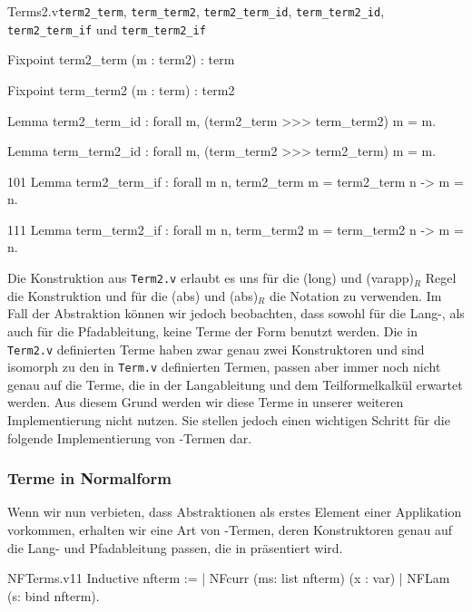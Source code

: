 \begin{multicode}{Terms2.v}{}{\texttt{term2\_term}, \texttt{term\_term2}, \texttt{term2\_term\_id}, \texttt{term\_term2\_id}, \texttt{term2\_term\_if} und \texttt{term\_term2\_if}}
    \begin{mcode}{43}
Fixpoint term2_term (m : term2) : term
    \end{mcode}
    \begin{mcode}{49}
Fixpoint term_term2 (m : term) : term2
\end{mcode}    
\begin{mcode}{60}
Lemma term2_term_id : forall m, (term2_term >>> term_term2) m = m.
\end{mcode}
\begin{mcode}{88}
Lemma term_term2_id : forall m, (term_term2 >>> term2_term) m = m.
\end{mcode}
\begin{mcode}{101}
Lemma term2_term_if : forall m n, 
    term2_term m = term2_term n -> m = n.
\end{mcode}
\begin{mcode}{111}
Lemma term_term2_if : forall m n, 
    term_term2 m = term_term2 n -> m = n.
\end{mcode}
\end{multicode}

Die Konstruktion aus \texttt{Term2.v} erlaubt es uns für die (long) und (varapp)$_R$ Regel die Konstruktion  und für die (abs) und (abs)$_R$ die Notation  zu verwenden.
Im Fall der Abstraktion können wir jedoch beobachten, dass sowohl für die Lang-, als auch für die Pfadableitung, keine Terme der Form  benutzt werden. Die in \texttt{Term2.v} definierten Terme haben zwar genau zwei Konstruktoren und sind isomorph zu den in \texttt{Term.v} definierten Termen, passen aber immer noch nicht genau auf die Terme, die in der Langableitung und dem Teilformelkalkül erwartet werden. Aus diesem Grund werden wir diese Terme in unserer weiteren Implementierung nicht nutzen. Sie stellen jedoch einen wichtigen Schritt für die folgende Implementierung von \tlambda-Termen dar.

\subsubsection{Terme in Normalform}
Wenn wir nun verbieten, dass Abstraktionen als erstes Element einer Applikation vorkommen, erhalten wir eine Art von \tlambda-Termen, deren Konstruktoren genau auf die Lang- und Pfadableitung passen, die in  präsentiert wird.
\begin{code}[nfterm]{NFTerms.v}{}{11}
Inductive nfterm :=
  | NFcurr (ms: list nfterm) (x : var)
  | NFLam (s: {bind nfterm}).
\end{code}

